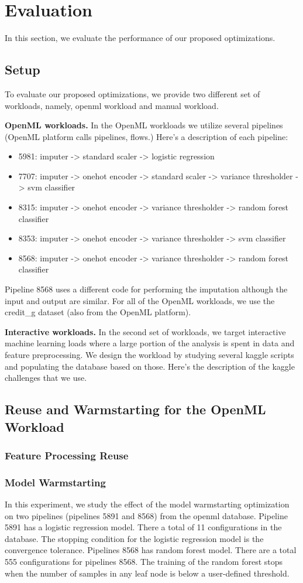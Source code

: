 \section{Evaluation} \label{sec-evaluation} 
In this section, we evaluate the performance of our proposed optimizations.
\subsection{Setup}
To evaluate our proposed optimizations, we provide two different set of workloads, namely, openml workload and manual workload.

\textbf{OpenML workloads.} In the OpenML workloads we utilize several pipelines (OpenML platform calls pipelines, flows.)
Here's a description of each pipeline:
\begin{itemize}
\item 5981: imputer -> standard scaler -> logistic regression
\item 7707: imputer -> onehot encoder -> standard scaler -> variance thresholder -> svm classifier
\item 8315: imputer -> onehot encoder -> variance thresholder -> random forest classifier
\item 8353: imputer -> onehot encoder -> variance thresholder -> svm classifier
\item 8568: imputer -> onehot encoder -> variance thresholder -> random forest classifier
\end{itemize}
Pipeline 8568 uses a different code for performing the imputation although the input and output are similar.
For all of the OpenML workloads, we use the credit\_g dataset (also from the OpenML platform).

\textbf{Interactive workloads.} In the second set of workloads, we target interactive machine learning loads where a large portion of the analysis is spent in data and feature preprocessing.
We design the workload by studying several kaggle scripts and populating the database based on those.
Here's the description of the kaggle challenges that we use.


\subsection{Reuse and Warmstarting for the OpenML Workload}
\subsubsection{Feature Processing Reuse}  
\subsubsection{Model Warmstarting}
In this experiment, we study the effect of the model warmstarting optimization on two pipelines (pipelines 5891 and 8568) from the openml database.
Pipeline 5891 has a logistic regression model.
There a total of 11 configurations in the database.
The stopping condition for the logistic regression model is the convergence tolerance.
Pipelines 8568 has random forest model.
There are a total 555 configurations for pipelines 8568.
The training of the random forest stops when the number of samples in any leaf node is below a user-defined threshold.

